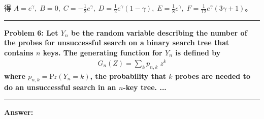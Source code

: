 \documentclass[11pt,fleqn]{article}
\newcommand\question[2]{\vspace{.25in}\hrule\textbf{#1: #2}\vspace{.5em}\hrule\vspace{.10in}}
\renewcommand\part[1]{\vspace{.10in}\textbf{#1}}
\begin{document}
得 $A = e^\gamma, \; B = 0, \; C = -\frac{1}{2} e^\gamma, \; D = \frac{1}{2} e^\gamma(1-\gamma), \; E = \frac{1}{8} e^\gamma, \; F = \frac{1}{12} e^\gamma (3 \gamma + 1)$。

\newpage

\question{Problem 6} {Let $Y_n$ be the random variable describing the number of the probes
	for unsuccessful search on a binary search tree that contains $n$ keys.
	The generating function for $Y_n$ is defined by
	\begin{align*}
		G_{n}(Z) = \sum_{k} p_{n,k} \; z^k
	\end{align*}
	where $p_{n,k} = \text{Pr}(Y_n = k)$, the probability that $k$ probes are needed to 
	do an unsuccessful search in an $n$-key tree. ...
}

\part{Answer:}
\end{document}

